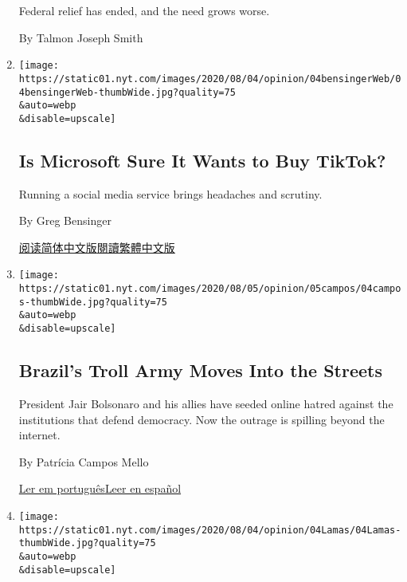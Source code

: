 \begin{enumerate}
  Federal relief has ended, and the need grows worse.

  By Talmon Joseph Smith
\item
  \href{/2020/08/04/opinion/tiktok-microsoft-trump.html}{}

  \texttt{[image: https://static01.nyt.com/images/2020/08/04/opinion/04bensingerWeb/04bensingerWeb-thumbWide.jpg?quality=75\\\&auto=webp\\\&disable=upscale]}

  \hypertarget{is-microsoft-sure-it-wants-to-buy-tiktok}{%
  \subsection{Is Microsoft Sure It Wants to Buy
  TikTok?}\label{is-microsoft-sure-it-wants-to-buy-tiktok}}

  Running a social media service brings headaches and scrutiny.

  By Greg Bensinger

  \href{https://cn.nytimes.com/opinion/20200805/tiktok-microsoft-trump/}{阅读简体中文版}\href{https://cn.nytimes.com/opinion/20200805/tiktok-microsoft-trump/zh-hant/}{閱讀繁體中文版}
\item
  \href{/2020/08/04/opinion/bolsonaro-office-of-hate-brazil.html}{}

  \texttt{[image: https://static01.nyt.com/images/2020/08/05/opinion/05campos/04campos-thumbWide.jpg?quality=75\\\&auto=webp\\\&disable=upscale]}

  \hypertarget{brazils-troll-army-moves-into-the-streets}{%
  \subsection{Brazil's Troll Army Moves Into the
  Streets}\label{brazils-troll-army-moves-into-the-streets}}

  President Jair Bolsonaro and his allies have seeded online hatred
  against the institutions that defend democracy. Now the outrage is
  spilling beyond the internet.

  By Patrícia Campos Mello

  \href{https://www.nytimes.com/pt/2020/08/04/opinion/international-world/bolsonaro-gabinete-do-odio.html}{Ler
  em
  português}\href{https://www.nytimes.com/es/2020/08/04/espanol/opinion/bolsonaro-oficina-odio-brasil.html}{Leer
  en español}
\item
  \href{/2020/08/04/opinion/covid-rural-hospitals.html}{}

  \texttt{[image: https://static01.nyt.com/images/2020/08/04/opinion/04Lamas/04Lamas-thumbWide.jpg?quality=75\\\&auto=webp\\\&disable=upscale]}


\end{enumerate}
